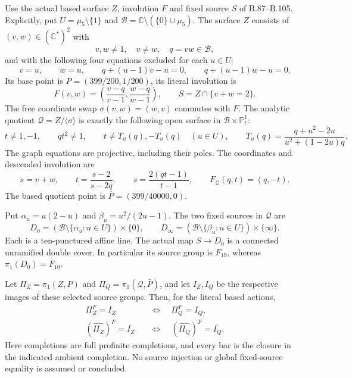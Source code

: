 \label{stmt:B106}
Use the actual based surface $Z$, involution $F$ and fixed source
$S$ of B.87--B.105. Explicitly, put $U=\mu _5\setminus\{1\}$ and
$\mathscr B=\mathbb C\setminus(\{0\}\cup\mu _5)$. The surface $Z$
consists of $(v,w)\in(\mathbb C^*)^2$ with
\[
 v,w\ne1,\quad v\ne w,\quad q=vw\in\mathscr B,
\]
and with the following four equations excluded for each $u\in U$:
\[
 v=u,\qquad w=u,\qquad q+(u-1)v-u=0,\qquad q+(u-1)w-u=0.
\]
Its base point is $P=(399/200,1/200)$, its literal involution is
\[
 F(v,w)=\left(\frac{v-q}{v-1},\frac{w-q}{w-1}\right),
 \qquad S=Z\cap\{v+w=2\}.
\]
The free coordinate swap $\sigma(v,w)=(w,v)$ commutes with $F$.
The analytic quotient $\mathscr Q=Z/\langle\sigma\rangle$ is exactly
the following open surface in $\mathscr B\times\mathbb P^1_t$:
\begin{equation}\label{eq:B106-surface}
 t\ne1,-1,\qquad qt^2\ne1,\qquad
 t\ne T_u(q),-T_u(q)\quad(u\in U),\qquad
 T_u(q)=\frac{q+u^2-2u}{u^2+(1-2u)q}.
\end{equation}
The graph equations are projective, including their poles. The
coordinates and descended involution are
\begin{equation}\label{eq:B106-chart}
 s=v+w,\qquad t=\frac{s-2}{s-2q},\qquad
 s=\frac{2(qt-1)}{t-1},\qquad F_{\mathscr Q}(q,t)=(q,-t).
\end{equation}
The based quotient point is $\bar P=(399/40000,0)$.

Put $\alpha_u=u(2-u)$ and $\beta_u=u^2/(2u-1)$. The two fixed
sources in $\mathscr Q$ are
\[
 D_0=(\mathscr B\setminus\{\alpha_u:u\in U\})\times\{0\},
 \qquad
 D_\infty=(\mathscr B\setminus\{\beta_u:u\in U\})\times\{\infty\}.
\]
Each is a ten-punctured affine line. The actual map $S\to D_0$
is a connected unramified double cover. In particular its source
group is $F_{19}$, whereas $\pi_1(D_0)=F_{10}$.

Let $\Pi_Z=\pi_1(Z,P)$ and $\Pi_Q=\pi_1(\mathscr Q,\bar P)$,
and let $I_Z,I_Q$ be the respective images of these selected source
groups. Then, for the literal based actions,
\begin{equation}\label{eq:B106-fixed-equivalence}
 \begin{aligned}
  \Pi_Z^F=I_Z&\quad\Longleftrightarrow\quad\Pi_Q^F=I_Q,\\
  (\widehat{\Pi_Z})^F=\overline{I_Z}
    &\quad\Longleftrightarrow\quad
       (\widehat{\Pi_Q})^F=\overline{I_Q}.
 \end{aligned}
\end{equation}
Here completions are full profinite completions, and every bar is
the closure in the indicated ambient completion. No source injection
or global fixed-source equality is assumed or concluded.

